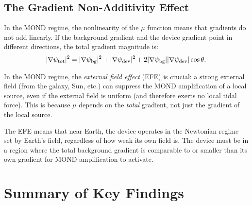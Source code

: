 \documentclass[aps,prd,twocolumn,superscriptaddress,nofootinbib]{revtex4-2}
\begin{document}
\subsection{The Gradient Non-Additivity Effect}

In the MOND regime, the nonlinearity of the $\mu$ function means that
gradients do not add linearly.  If the background gradient and the
device gradient point in different directions, the total gradient
magnitude is:
\begin{equation}
|\nabla\psi_{\rm tot}|^2 = |\nabla\psi_{\rm bg}|^2 + |\nabla\psi_{\rm dev}|^2
+ 2|\nabla\psi_{\rm bg}||\nabla\psi_{\rm dev}|\cos\theta.
\end{equation}

In the MOND regime, the \emph{external field effect} (EFE) is crucial:
a strong external field (from the galaxy, Sun, etc.) can suppress the
MOND amplification of a local source, even if the external field is
uniform (and therefore exerts no local tidal force).  This is because
$\mu$ depends on the \emph{total} gradient, not just the gradient of
the local source.

The EFE means that near Earth, the device operates in the Newtonian
regime set by Earth's field, regardless of how weak its own field is.
The device must be in a region where the total background gradient
is comparable to or smaller than its own gradient for MOND amplification
to activate.


\section{Summary of Key Findings}\label{sec:summary}
\end{document}
